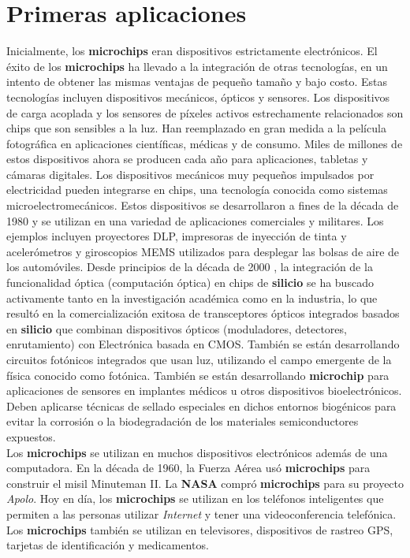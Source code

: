 \section{Primeras aplicaciones}
Inicialmente, los \textbf{microchips} eran dispositivos estrictamente electrónicos. El éxito de los \textbf{microchips} ha llevado a la integración de otras tecnologías,
en un intento de obtener las mismas ventajas de pequeño tamaño y bajo costo. Estas tecnologías incluyen dispositivos mecánicos, ópticos y sensores. Los dispositivos de
carga acoplada y los sensores de píxeles activos estrechamente relacionados son chips que son sensibles a la luz. Han reemplazado en gran medida a la película fotográfica
en aplicaciones científicas, médicas y de consumo. Miles de millones de estos dispositivos ahora se producen cada año para aplicaciones, tabletas
y cámaras digitales. Los dispositivos mecánicos muy pequeños impulsados por electricidad pueden integrarse en chips, una tecnología conocida como sistemas microelectromecánicos.
Estos dispositivos se desarrollaron a fines de la década de 1980 y se utilizan en una variedad de aplicaciones comerciales y militares. Los ejemplos incluyen proyectores
DLP, impresoras de inyección de tinta y acelerómetros y giroscopios MEMS utilizados para desplegar las bolsas de aire de los automóviles. Desde principios de la década de 2000
, la integración de la funcionalidad óptica (computación óptica) en chips de \textbf{silicio} se ha buscado activamente tanto en la investigación académica como en la industria,
lo que resultó en la comercialización exitosa de transceptores ópticos integrados basados en \textbf{silicio} que combinan dispositivos ópticos (moduladores, detectores,
enrutamiento) con Electrónica basada en CMOS. También se están desarrollando circuitos fotónicos integrados que usan luz, utilizando el campo emergente de la física conocido
como fotónica. También se están desarrollando \textbf{microchip} para aplicaciones de sensores en implantes médicos u otros dispositivos bioelectrónicos. Deben aplicarse
técnicas de sellado especiales en dichos entornos biogénicos para evitar la corrosión o la biodegradación de los materiales semiconductores expuestos.\\
Los \textbf{microchips} se utilizan en muchos dispositivos electrónicos además de una computadora. En la década de 1960, la Fuerza Aérea usó \textbf{microchips}
para construir el misil Minuteman II. La \textbf {NASA} compró \textbf{microchips} para su proyecto \emph{Apolo}. Hoy en día, los \textbf{microchips} se utilizan
en los teléfonos inteligentes que permiten a las personas utilizar \emph{Internet} y tener una videoconferencia telefónica. Los \textbf{microchips} también se
utilizan en televisores, dispositivos de rastreo GPS, tarjetas de identificación y medicamentos. \\

